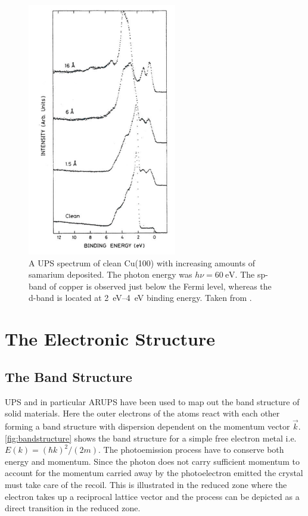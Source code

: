 \begin{figure}[h!]
	\begin{center}
	\includegraphics[scale=4]{figures/05_02.png}
	\caption{A UPS spectrum of clean Cu(100) with increasing amounts of samarium deposited. The photon energy was $h\nu=\SI{60}{\electronvolt}$. The sp-band of copper is observed just below the Fermi level, whereas the d-band is located at \SIrange{2}{4}{\electronvolt} binding energy. Taken from \cite{Andersen}.}
	\label{fig:cuups}
	\end{center}
\end{figure}

\section{The Electronic Structure}
\subsection{The Band Structure}
UPS and in particular ARUPS have been used to map out the band structure of solid materials. Here the outer electrons of the atoms react with each other forming a band structure with dispersion dependent on the momentum vector $\vec{k}$. \autoref{fig:bandstructure} shows the band structure for a simple free electron metal i.e. $E(k)=(\hbar k)^2/(2m)$. The photoemission process have to conserve both energy and momentum. Since the photon does not carry sufficient momentum to account for the momentum carried away by the photoelectron emitted the crystal must take care of the recoil. This is illustrated in the reduced zone where the electron takes up a reciprocal lattice vector and the process can be depicted as a direct transition in the reduced zone.

